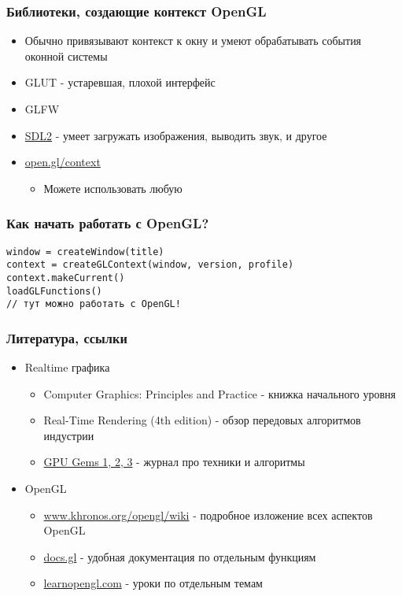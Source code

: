 \documentclass{beamer}
\begin{document}
\begin{frame}
\frametitle{Библиотеки, создающие контекст OpenGL}
\begin{itemize}
\item Обычно привязывают контекст к окну и умеют обрабатывать события оконной системы
\item GLUT - устаревшая, плохой интерфейс
\item GLFW
\item {\color{blue}\underline{SDL2}} - умеет загружать изображения, выводить звук, и другое
\item \url{open.gl/context}
\begin{itemize}
\item Можете использовать любую
\end{itemize}
\end{itemize}
\end{frame}

\begin{frame}[fragile]
\frametitle{Как начать работать с OpenGL?}
\begin{verbatim}
window = createWindow(title)
context = createGLContext(window, version, profile)
context.makeCurrent()
loadGLFunctions()
// тут можно работать с OpenGL!
\end{verbatim}
\end{frame}

\begin{frame}
\frametitle{Литература, ссылки}
\begin{itemize}
\item Realtime графика
\begin{itemize}
\item Computer Graphics: Principles and Practice - книжка начального уровня
\item Real-Time Rendering (4th edition) - обзор передовых алгоритмов индустрии
\item \href{developer.nvidia.com/gpugems}{GPU Gems 1, 2, 3} - журнал про техники и алгоритмы
\end{itemize}
\item OpenGL
\begin{itemize}
\item \url{www.khronos.org/opengl/wiki} - подробное изложение всех аспектов OpenGL
\item \url{docs.gl} - удобная документация по отдельным функциям
\item \url{learnopengl.com} - уроки по отдельным темам
\end{itemize}
\end{itemize}
\end{frame}
\end{document}
